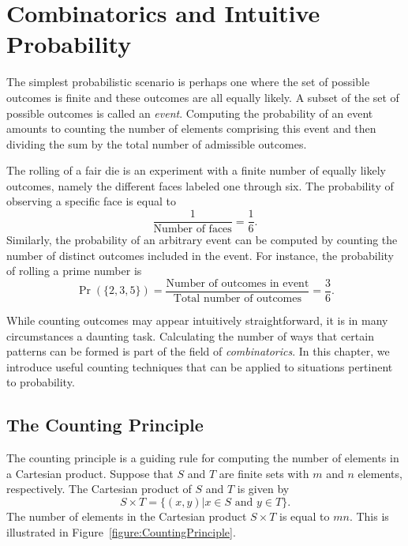 \chapter[Combinatorics]{Combinatorics and Intuitive Probability}

The simplest probabilistic scenario is perhaps one where the set of possible outcomes is finite and these outcomes are all equally likely.
A subset of the set of possible outcomes is called an \emph{event}.
Computing the probability of an event amounts to counting the number of elements comprising this event and then dividing the sum by the total number of admissible outcomes.

\begin{example}
The rolling of a fair die is an experiment with a finite number of equally likely outcomes, namely the different faces labeled one through six.
The probability of observing a specific face is equal to
\begin{equation*}
\frac{1}{\text{Number of faces}} = \frac{1}{6} .
\end{equation*}
Similarly, the probability of an arbitrary event can be computed by counting the number of distinct outcomes included in the event.
For instance, the probability of rolling a prime number is
\begin{equation*}
\Pr ( \{ 2, 3, 5 \} )
= \frac{\text{Number of outcomes in event}}{\text{Total number of outcomes}}
= \frac{3}{6} .
\end{equation*}
\end{example}

While counting outcomes may appear intuitively straightforward, it is in many circumstances a daunting task.
Calculating the number of ways that certain patterns can be formed is part of the field of \emph{combinatorics}. 
In this chapter, we introduce useful counting techniques that can be applied to situations pertinent to probability.


\section{The Counting Principle}

The counting principle is a guiding rule for computing the number of elements in a Cartesian product.
Suppose that $S$ and $T$ are finite sets with $m$ and $n$ elements, respectively.
The Cartesian product of $S$ and $T$ is given by
\begin{equation*}
S \times T = \{ (x, y) | x \in S \text{ and } y \in T \} .
\end{equation*}
The number of elements in the Cartesian product $S \times T$ is equal to $m n$.
This is illustrated in Figure~\ref{figure:CountingPrinciple}.

